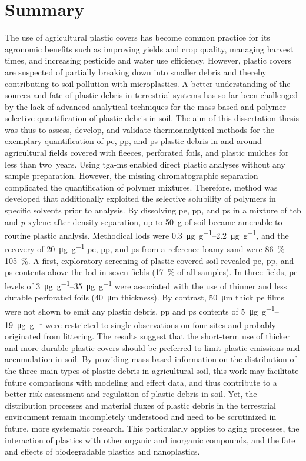 
\chapter{Summary}

The use of agricultural plastic covers has become common practice for its agronomic benefits such as improving yields and crop quality, managing harvest times, and increasing pesticide and water use efficiency. However, plastic covers are suspected of partially breaking down into smaller debris and thereby contributing to soil pollution with microplastics.
A better understanding of the sources and fate of plastic debris in terrestrial systems has so far been challenged by the lack of advanced analytical techniques for the mass-based and polymer-selective quantification of plastic debris in soil. The aim of this dissertation thesis was thus to assess, develop, and validate thermoanalytical methods for the exemplary quantification of \ac{pe}, \ac{pp}, and \ac{ps} plastic debris in and around agricultural fields covered with fleeces, perforated foils, and plastic mulches for less than two~years.
Using \ac{tga-ms} enabled direct plastic analyses without any sample preparation. However, the missing chromatographic separation complicated the quantification of polymer mixtures. Therefore,  method was developed that additionally exploited the selective solubility of polymers in specific solvents prior to analysis. By dissolving \ac{pe}, \ac{pp}, and \ac{ps} in a mixture of \ac{tcb} and \textit{p}-xylene after density separation, up to \SI{50}{\gram} of soil became amenable to routine plastic analysis. Methodical \acp{lod} were \SIrange{0.3}{2.2}{\micro\gram\per\gram}, and the recovery of \SI{20}{\micro\gram\per\gram} \ac{pe}, \ac{pp}, and \ac{ps} from a reference loamy sand were \SIrange{86}{105}{\percent}.
A first, exploratory screening of plastic-covered soil revealed \ac{pe}, \ac{pp}, and \ac{ps} contents above the \ac{lod} in seven fields (\SI{17}{\percent} of all samples). In three fields, \ac{pe} levels of \SIrange{3}{35}{\micro\gram\per\gram} were associated with the use of thinner and less durable perforated foils (\SI{40}{\micro\meter} thickness). By contrast, \SI{50}{\micro\meter} thick \ac{pe} films were not shown to emit any plastic debris. \Ac{pp} and \ac{ps} contents of \SIrange{5}{19}{\micro\gram\per\gram} were restricted to single observations on four sites and probably originated from littering. 
The results suggest that the short-term use of thicker and more durable plastic covers should be preferred to limit plastic emissions and accumulation in soil.
By providing mass-based information on the distribution of the three main types of plastic debris in agricultural soil, this work may facilitate future comparisons with modeling and effect data, and thus contribute to a better risk assessment and regulation of plastic debris in soil. Yet, the distribution processes and material fluxes of plastic debris in the terrestrial environment remain incompletely understood and need to be scrutinized in future, more systematic research. This particularly applies to aging processes, the interaction of plastics with other organic and inorganic compounds, and the fate and effects of biodegradable plastics and nanoplastics.